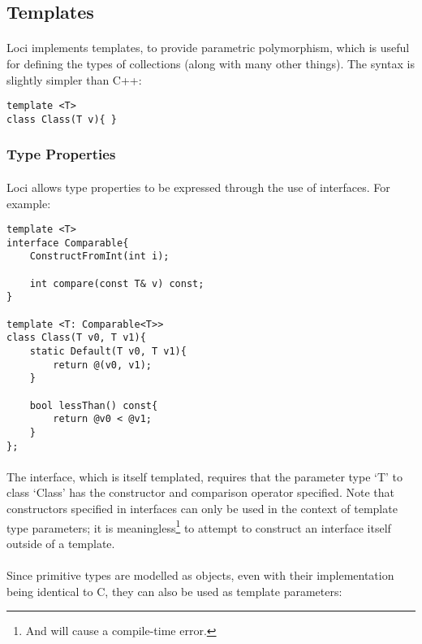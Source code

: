\documentclass[12pt,twoside,notitlepage]{report}
\begin{document}
\clearpage

\subsection{Templates}

\paragraph{}
Loci implements templates, to provide parametric polymorphism, which is useful for defining the types of collections (along with many other things). The syntax is slightly simpler than C++:

\begin{lstlisting}
template <T>
class Class(T v){ }
\end{lstlisting}


\subsubsection{Type Properties}

\paragraph{}
Loci allows type properties to be expressed through the use of interfaces. For example:


\begin{lstlisting}
template <T>
interface Comparable{
	ConstructFromInt(int i);

	int compare(const T& v) const;
}

template <T: Comparable<T>>
class Class(T v0, T v1){
	static Default(T v0, T v1){
		return @(v0, v1);
	}

	bool lessThan() const{
		return @v0 < @v1;
	}
};
\end{lstlisting}


\paragraph{}
The interface, which is itself templated, requires that the parameter type `T' to class `Class' has the constructor and comparison operator specified. Note that constructors specified in interfaces can only be used in the context of template type parameters; it is meaningless\footnote{And will cause a compile-time error.} to attempt to construct an interface itself outside of a template.

\paragraph{}
Since primitive types are modelled as objects, even with their implementation being identical to C, they can also be used as template parameters:
\end{document}
